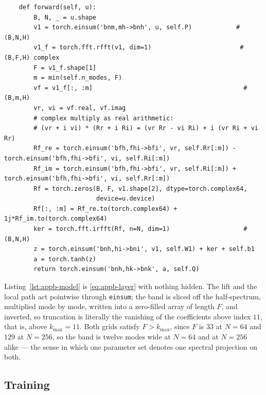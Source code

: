 \begin{lstlisting}
    def forward(self, u):
        B, N, _ = u.shape
        v1 = torch.einsum('bnm,mh->bnh', u, self.P)            # (B,N,H)
        v1_f = torch.fft.rfft(v1, dim=1)                        # (B,F,H) complex
        F = v1_f.shape[1]
        m = min(self.n_modes, F)
        vf = v1_f[:, :m]                                         # (B,m,H)
        vr, vi = vf.real, vf.imag
        # complex multiply as real arithmetic:
        # (vr + i vi) * (Rr + i Ri) = (vr Rr - vi Ri) + i (vr Ri + vi Rr)
        Rf_re = torch.einsum('bfh,fhi->bfi', vr, self.Rr[:m]) - torch.einsum('bfh,fhi->bfi', vi, self.Ri[:m])
        Rf_im = torch.einsum('bfh,fhi->bfi', vr, self.Ri[:m]) + torch.einsum('bfh,fhi->bfi', vi, self.Rr[:m])
        Rf = torch.zeros(B, F, v1.shape[2], dtype=torch.complex64,
                         device=u.device)
        Rf[:, :m] = Rf_re.to(torch.complex64) + 1j*Rf_im.to(torch.complex64)
        ker = torch.fft.irfft(Rf, n=N, dim=1)                    # (B,N,H)
        z = torch.einsum('bnh,hi->bni', v1, self.W1) + ker + self.b1
        a = torch.tanh(z)
        return torch.einsum('bnh,hk->bnk', a, self.Q)
\end{lstlisting}

Listing~\ref{lst:appb-model} is \eqref{eq:appb-layer} with nothing hidden. The lift
and the local path act pointwise through \texttt{einsum}; the band is sliced off the
half-spectrum, multiplied mode by mode, written into a zero-filled array of length
$F$, and inverted, so truncation is literally the vanishing of the coefficients above
index $11$, that is, above $k_{\max}=11$. Both grids satisfy $F>k_{\max}$, since $F$ is
$33$ at $N=64$ and $129$ at $N=256$, so the band is twelve modes wide at $N=64$ and at
$N=256$ alike --- the sense in which one parameter set denotes one spectral projection
on both.

\subsection{Training}

